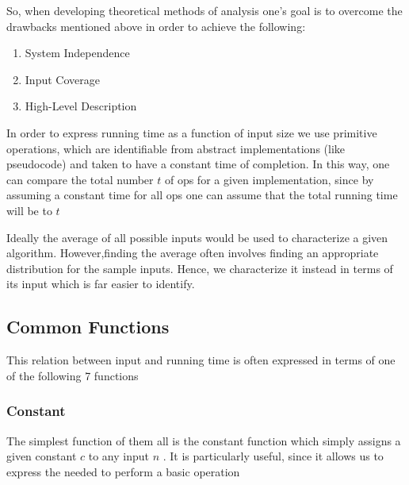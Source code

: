 \par{So, when developing theoretical methods of analysis one's goal is to overcome the drawbacks mentioned above in order to achieve the following:}

\begin{enumerate}
	\item System Independence
	\item Input Coverage
	\item High-Level Description
\end{enumerate}



\par{In order to express running time as a function of input size we use primitive operations, which are identifiable from abstract implementations (like
pseudocode) and taken to have a constant time of completion. In this way, one can compare the total number $t$ of ops for a given implementation, since by
assuming a constant time for all ops one can assume that the total running time will be  to $t$} 

\par{Ideally the average of all possible inputs would be used to characterize a given algorithm. However,finding the average often involves finding an
		appropriate distribution for the sample inputs. Hence, we characterize it instead in terms of its  input which is far easier to
		identify. }

\subsection{Common Functions}

\par{This relation between input and running time is often expressed in terms of one of the following 7 functions}

\subsubsection{Constant}

	\par{The simplest function of them all is the constant function which simply
	assigns a given constant $c$ to any input $n$ . It is particularly useful,
	since it allows us to express the  needed to perform a basic
	operation}
	
